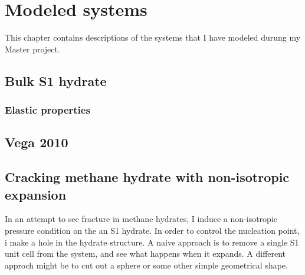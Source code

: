 
\chapter{Modeled systems}
This chapter contains descriptions of the systems that I have modeled durung my Master project. 
\section{Bulk S1 hydrate}
\subsection{Elastic properties}

\section{Vega 2010}
\section{Cracking methane hydrate with non-isotropic expansion}
In an attempt to see fracture in methane hydrates, I induce a non-isotropic pressure condition on the an S1 hydrate. In order to control the nucleation point, i make a hole in the hydrate structure. A naive approach is to remove a single S1 unit cell from the system, and see what happens when it expands. A different approch might be to cut out a sphere or some other simple geometrical shape. 


